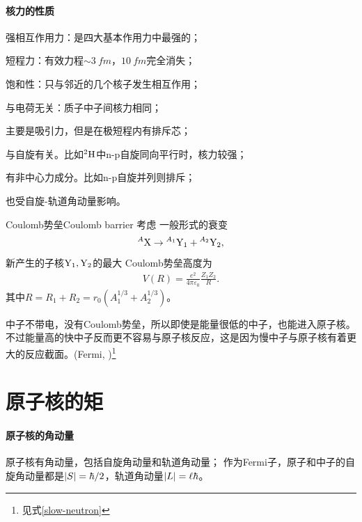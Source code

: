 \paragraph{核力的性质}
\begin{compactenum}
	\item 强相互作用力：是四大基本作用力中最强的；
	\item 短程力：有效力程$\sim\SI{3}{fm}$，$\SI{10}{fm}$完全消失；
	\item 饱和性：只与邻近的几个核子发生相互作用；
	\item 与电荷无关：质子中子间核力相同；
	\item 主要是吸引力，但是在极短程内有排斥芯；
	\item 与自旋有关。比如${^{2}\mathrm{H}}$中n-p自旋同向平行时，核力较强；
	\item 有非中心力成分。比如n-p自旋并列则排斥；
	\item 也受自旋-轨道角动量影响。
\end{compactenum}

\begin{definition}
	{Coulomb势垒}{Coulomb barrier}
	考虑
	一般形式的衰变
	\[
		{^{A}\mathrm{X}}\to{^{A_1}\mathrm{Y_1}}+{^{A_2}\mathrm{Y_2}},
	\]
	新产生的子核$\mathrm{Y}_1,\mathrm{Y}_2$的最大
	Coulomb势垒高度为
	\begin{align}
		V(R)=\frac{e^2}{4\pi\varepsilon_0}\frac{Z_1Z_2}{R}.
	\end{align}
	其中$R=R_1+R_2=r_0(A_1^{1/3}+A_2^{1/3})$。
\end{definition}

\begin{remark}
	中子不带电，没有Coulomb势垒，所以即使是能量很低的中子，也能进入原子核。
	不过能量高的快中子反而更不容易与原子核反应，这是因为慢中子与原子核有着更大的反应截面。(Fermi, )\footnote{见式\eqref{slow-neutron}}
\end{remark}

\section{原子核的矩}

\paragraph{原子核的角动量}

原子核有角动量，包括自旋角动量和轨道角动量；
作为Fermi子，原子和中子的自旋角动量都是$\left\lvert S\right\rvert=\hbar/2$，轨道角动量$\left\lvert L\right\rvert=\ell\hbar$。


